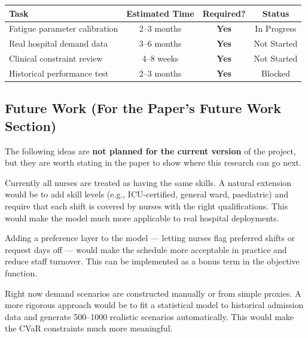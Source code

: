 \documentclass[12pt,a4paper]{article}
\begin{document}
\begin{center}
\begin{tabular}{lccc}
  \toprule
  \textbf{Task} & \textbf{Estimated Time} & \textbf{Required?} & \textbf{Status}\\
  \midrule
  Fatigue parameter calibration & 2–3 months & \textcolor{accentred}{\textbf{Yes}} & \colorbox{paleyellow}{\small In Progress}\\
  Real hospital demand data     & 3–6 months & \textcolor{accentred}{\textbf{Yes}} & \colorbox{palered}{\small Not Started}\\
  Clinical constraint review    & 4–8 weeks  & \textcolor{accentred}{\textbf{Yes}} & \colorbox{palered}{\small Not Started}\\
  Historical performance test   & 2–3 months & \textcolor{accentred}{\textbf{Yes}} & \colorbox{palered}{\small Blocked}\\
  \bottomrule
\end{tabular}
\end{center}

\subsection{Future Work (For the Paper's Future Work Section)}

The following ideas are \textbf{not planned for the current version} of the project, but they are worth stating in the paper to show where this research can go next.

\begin{solutionbox}
Currently all nurses are treated as having the same skills. A natural extension would be to add skill levels (e.g., ICU-certified, general ward, paediatric) and require that each shift is covered by nurses with the right qualifications. This would make the model much more applicable to real hospital deployments.
\end{solutionbox}

\vspace{6pt}
\begin{solutionbox}
Adding a preference layer to the model — letting nurses flag preferred shifts or request days off — would make the schedule more acceptable in practice and reduce staff turnover. This can be implemented as a bonus term in the objective function.
\end{solutionbox}

\vspace{6pt}
\begin{solutionbox}
Right now demand scenarios are constructed manually or from simple proxies. A more rigorous approach would be to fit a statistical model to historical admission data and generate 500–1000 realistic scenarios automatically. This would make the CVaR constraints much more meaningful.
\end{solutionbox}
\end{document}
